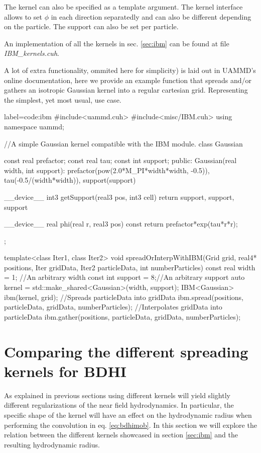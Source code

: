 \documentclass[ twoside,openright,titlepage,numbers=noenddot,%
headinclude,footinclude,cleardoublepage=empty,abstract=on,
BCOR=5mm,paper=a4,fontsize=11pt, dvipsnames
]{scrreprt}
\newcommand{\uammd}{\gls{UAMMD}\xspace}
\begin{document}
The kernel can also be specified as a template argument. The kernel interface allows to set $\phi$ in each direction separatedly and can also be different depending on the particle. The support can also be set per particle.

An implementation of all the kernels in sec. \ref{sec:ibm} can be found at file \emph{IBM\_kernels.cuh}.

A lot of extra functionality, ommited here for simplicity) is laid out in \uammd's online documentation, here we provide an example function that spreads and/or gathers an isotropic Gaussian kernel into a regular cartesian grid. Representing the simplest, yet most usual, use case.

\begin{code2}  {label=code:ibm}
#include<uammd.cuh>
#include<misc/IBM.cuh>
using namespace uammd;

//A simple Gaussian kernel compatible with the IBM module.
class Gaussian{
  const real prefactor;
  const real tau;
  const int support;
public:
  Gaussian(real width, int support):
    prefactor(pow(2.0*M_PI*width*width, -0.5)),
    tau(-0.5/(width*width)),
    support(support){}

  __device__ int3 getSupport(real3 pos, int3 cell){
    return {support, support, support}
  }

  __device__ real phi(real r, real3 pos) const{
    return prefactor*exp(tau*r*r);
  }
};

template<class Iter1, class Iter2>
void spreadOrInterpWithIBM(Grid grid, real4* positions,
                   Iter gridData, Iter2 particleData,
                   int numberParticles){
  const real width = 1; //An arbitrary width
  const int support = 8;//An arbitrary support
  auto kernel = std::make_shared<Gaussian>(width, support);
  IBM<Gaussian> ibm(kernel, grid);
  //Spreads particleData into gridData
  ibm.spread(positions, particleData, gridData, numberParticles);
  //Interpolates gridData into particleData
  ibm.gather(positions, particleData, gridData, numberParticles);
}
\end{code2}




\section{Comparing the different spreading kernels for BDHI}\label{sec:kernelcomp}
As explained in previous sections using different kernels will yield slightly different regularizations of the near field hydrodynamics. In particular, the specific shape of the kernel will have an effect on the hydrodynamic radius when performing the convolution in eq. \eqref{eq:bdhimob}. In this section we will explore the relation between the different kernels showcased in section \ref{sec:ibm} and the resulting hydrodynamic radius. 
\end{document}
